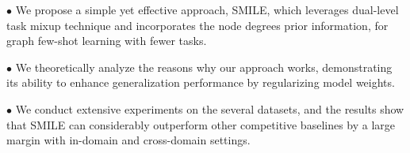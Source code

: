 \noindent $\bullet$ We propose a simple yet effective approach, SMILE, which leverages dual-level task mixup technique and incorporates the node degrees prior information, for graph few-shot learning with fewer tasks. 

\noindent $\bullet$ We theoretically analyze the reasons why our approach works, demonstrating its ability to enhance generalization performance by regularizing model weights.

\noindent $\bullet$ We conduct extensive experiments on the several datasets, and the results show that SMILE can considerably outperform other competitive baselines by a large margin with in-domain and cross-domain settings.